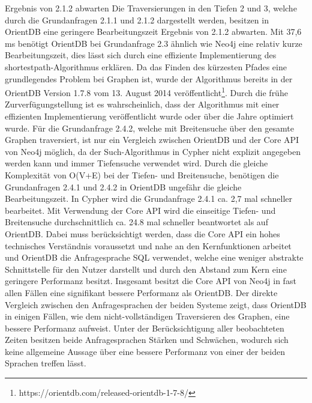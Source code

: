 {\color{red} Ergebnis von 2.1.2 abwarten} Die Traversierungen in den Tiefen 2 und 3, welche durch die Grundanfragen 2.1.1 und 2.1.2 dargestellt werden, besitzen in OrientDB eine geringere Bearbeitungszeit {\color{red} Ergebnis von 2.1.2 abwarten}. \newline  
Mit 37,6 ms benötigt OrientDB bei Grundanfrage 2.3 ähnlich wie Neo4j eine relativ kurze Bearbeitungszeit, dies lässt sich durch eine effiziente Implementierung des shortestpath-Algorithmus erklären. Da das Finden des kürzesten Pfades eine grundlegendes Problem bei Graphen ist, wurde der Algorithmus bereits in der OrientDB Version 1.7.8 vom 13. August 2014 veröffentlicht\footnote{https://orientdb.com/released-orientdb-1-7-8/}. Durch die frühe Zurverfügungstellung ist es wahrscheinlich, dass der Algorithmus mit einer effizienten Implementierung veröffentlicht wurde oder über die Jahre optimiert wurde. \newline
Für die Grundanfrage 2.4.2, welche mit Breitensuche über den gesamte Graphen traversiert, ist nur ein Vergleich zwischen OrientDB und der Core API von Neo4j möglich, da der Such-Algorithmus in Cypher nicht explizit angegeben werden kann und immer Tiefensuche verwendet wird. Durch die gleiche Komplexität von O(V+E) bei der Tiefen- und Breitensuche, benötigen die Grundanfragen 2.4.1 und 2.4.2 in OrientDB ungefähr die gleiche Bearbeitungszeit. In Cypher wird die Grundanfrage 2.4.1 ca. 2,7 mal schneller bearbeitet. Mit Verwendung der Core API wird die einseitige Tiefen- und Breitensuche durchschnittlich ca. 24.8 mal schneller beantwortet als auf OrientDB. Dabei muss berücksichtigt werden, dass die Core API ein hohes technisches Verständnis voraussetzt und nahe an den Kernfunktionen arbeitet und OrientDB die Anfragesprache SQL verwendet, welche eine weniger abstrakte Schnittstelle für den Nutzer darstellt und durch den Abstand zum Kern eine geringere Performanz besitzt. \newline
Insgesamt besitzt die Core API von Neo4j in fast allen Fällen eine signifikant bessere Performanz als OrientDB. Der direkte Vergleich zwischen den Anfragesprachen der beiden Systeme zeigt, dass OrientDB in einigen Fällen, wie dem nicht-vollständigen Traversieren des Graphen, eine bessere Performanz aufweist. Unter der Berücksichtigung aller beobachteten Zeiten besitzen beide Anfragesprachen Stärken und Schwächen, wodurch sich keine allgemeine Aussage über eine bessere Performanz von einer der beiden Sprachen treffen lässt. 
\FloatBarrier
